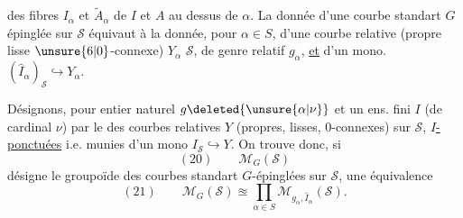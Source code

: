 des fibres $I_\alpha$ et $\widetilde A_\alpha$ de $I$ et $A$ au dessus de $\alpha$. La donnée d'une courbe standart $G$ épinglée sur $\mathcal S$ équivaut à la donnée,  pour  $\alpha\in S$, d'une courbe relative (propre lisse  $\unsure{6|0}$-connexe) $Y_\alpha$  $\mathcal S$, de genre relatif $g_\alpha$, \uline{et} d'un mono. $(\widehat I_\alpha)_{\mathcal S}\hookrightarrow Y_\alpha$.

Désignons,  pour  entier naturel $g\deleted{\unsure{\alpha|\nu}}$ et un ens. fini $I$ (de cardinal $\nu$) par
le  des courbes relatives $Y$ (propres, lisses, $0$-connexes) sur $\mathcal S$, \uline{$I$-ponctuées} i.e. munies d'un mono $I_{\mathcal S}\hookrightarrow Y$. On trouve donc, si
\[
(20)\qquad\mathcal M_G(\mathcal S)
\]
désigne le groupoïde des courbes standart $G$-épinglées sur $\mathcal S$, une équivalence
\[
(21)\qquad\mathcal M_G(\mathcal S)\approxeq\prod_{\alpha\in S}\mathcal M_{g_\alpha,\widehat I_\alpha}(\mathcal S).
\]
